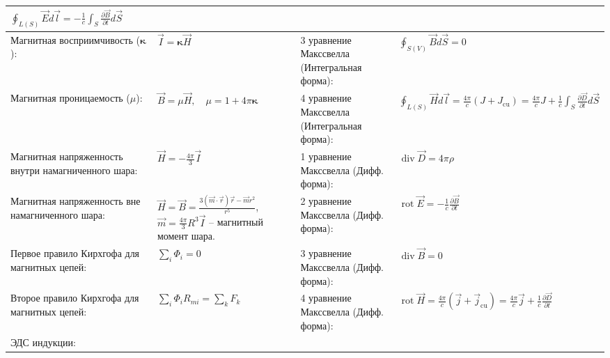 \documentclass{article}
\begin{document}
\begin{tabular}{ |p{6cm}|p{3.5cm}|p{6cm}|p{3.5cm}|  }
$\oint_{L(S)} \vec{E} d \vec{l}=-\frac{1}{c} \int_{S} \frac{\partial \vec{B}}{\partial t} d \vec{S}$\\
\hline
Магнитная восприимчивость ($\boldsymbol{\kappa}$):                         &
$\vec{I}=\boldsymbol{\kappa} \vec{H}$                                      &
3 уравнение Макссвелла (Интегральная форма):                               &
$\oint_{S(V)} \vec{B} d \vec{S}=0$                                         \\
\hline
Магнитная проницаемость ($\mu$):                                           &
$\vec{B}=\mu \vec{H}, \quad \mu=1+4 \pi \boldsymbol{\kappa}$               &
4 уравнение Макссвелла (Интегральная форма):                               &
$\oint_{L(S)} \vec{H} d \vec{l}=\frac{4 \pi}{c}\left(J+J_{\mathrm{cu}}\right)=\frac{4 \pi}{c} J+\frac{1}{c} \int_{S} \frac{\partial \vec{D}}{\partial t} d \vec{S}$\\
\hline
Магнитная напряженность внутри намагниченного шара:                        &
$\vec{H}=-\frac{4 \pi}{3} \vec{I}$                                         &
1 уравнение Макссвелла (Дифф. форма):                                      &
$\operatorname{div} \vec{D}=4 \pi \rho$                                    \\
\hline
Магнитная напряженность вне намагниченного шара:                           &
$\vec{H}=\vec{B}=\frac{3(\vec{m} \cdot \vec{r}) \vec{r}-\vec{m} r^{2}}{r^{5}}$,
$\vec{m}=\frac{4 \pi}{3} R^{3} \vec{I}$ -- магнитный момент шара.          &
2 уравнение Макссвелла (Дифф. форма):                                      &
$\operatorname{rot} \vec{E}=-\frac{1}{c} \frac{\partial \vec{B}}{\partial t}$\\
\hline
Первое правило Кирхгофа для магнитных цепей:                               &
$\sum_{i} \Phi_{i}=0$                                                      &
3 уравнение Макссвелла (Дифф. форма):                                      &
$\operatorname{div} \vec{B}=0$                                             \\
\hline
Второе правило Кирхгофа для магнитных цепей:                               &
$\sum_{i} \Phi_{i} R_{m i}=\sum_{k} F_{k}$                                 &
4 уравнение Макссвелла (Дифф. форма):                                      &
$\operatorname{rot} \vec{H}=\frac{4 \pi}{c}\left(\vec{j}+\vec{j}_{\mathrm{cu}}\right)=\frac{4 \pi}{c} \vec{j}+\frac{1}{c} \frac{\partial \vec{D}}{\partial t}$\\
\hline
ЭДС индукции:                                                              &

\end{tabular}
\end{document}
